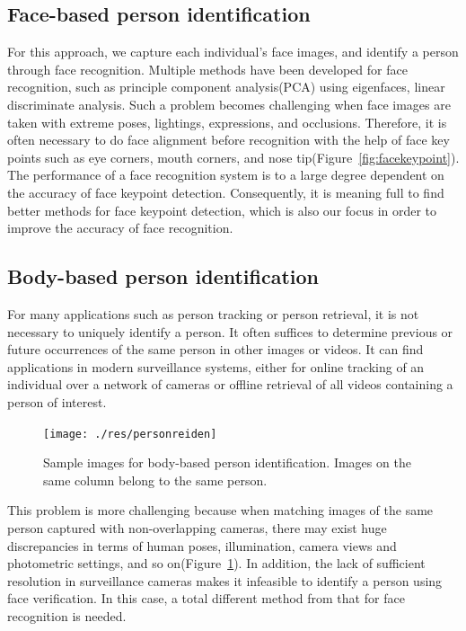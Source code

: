 \documentclass[pdftex,12pt,a4paper]{report}
\begin{document}
\subsection{Face-based person identification} 
For this approach, we capture each individual's face images, and identify a
person through face recognition. Multiple methods have been developed for face
recognition, such as principle component analysis(PCA) using eigenfaces, linear
discriminate analysis. Such a problem becomes challenging when face images are
taken with extreme poses, lightings, expressions, and occlusions. Therefore, it
is often necessary to do face alignment before recognition with the help of face
key points such as eye corners, mouth corners, and nose
tip(Figure~\ref{fig:facekeypoint}). The performance of
a face recognition system is to a large degree dependent on the accuracy of face
keypoint detection. Consequently, it is meaning full to find better methods for
face keypoint detection, which is also our focus in order to improve the
accuracy of face recognition.

\subsection{Body-based person identification} 
For many applications such as person tracking or person retrieval, it is not
necessary to uniquely identify a person. It often suffices to determine previous 
or future occurrences of the same person in other images or videos. It can find 
applications in modern surveillance systems, either for online tracking of an 
individual over a network of cameras or offline retrieval of all videos 
containing a person of interest. 

\begin{figure}[h]
    \begin{center}
        \texttt{[image: ./res/personreiden]}
    \end{center}
    \caption{Sample images for body-based person identification. Images on the
    same column belong to the same person.}
    \label{fig:personreiden}
\end{figure}

This problem is more challenging because when matching images of the same person 
captured with non-overlapping cameras, there 
may exist huge discrepancies in terms of human poses, illumination, camera views 
and photometric settings, and so on(Figure~\ref{fig:personreiden}). In addition, 
the lack of sufficient 
resolution in surveillance cameras makes it infeasible to identify a person 
using face verification. In this case, a total different method from that for 
face recognition is needed.
\end{document}
